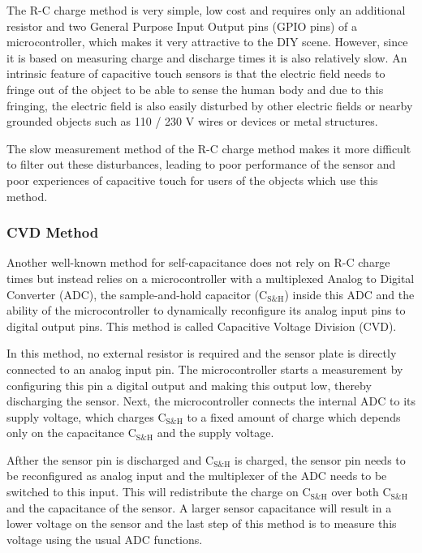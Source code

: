\documentclass{sigchi}
\begin{document}
The R-C charge method is very simple, low cost and requires only an additional
resistor and two General Purpose Input Output pins (GPIO pins) of a
microcontroller, which makes it very attractive to the DIY scene. However, since
it is based on measuring charge and discharge times it is also relatively slow.
An intrinsic feature of capacitive touch sensors is that the electric field
needs to fringe out of the object to be able to sense the human body and due to
this fringing, the electric field is also easily disturbed by other electric
fields or nearby grounded objects such as 110 / 230 V wires or devices or metal
structures.

The slow measurement method of the R-C charge method makes it more difficult to
filter out these disturbances, leading to poor performance of the sensor and
poor experiences of capacitive touch for users of the objects which use this
method.

\subsubsection{CVD Method}
Another well-known method for self-capacitance does not rely on R-C charge times
but instead relies on a microcontroller with a multiplexed Analog to Digital
Converter (ADC), the sample-and-hold capacitor ($\textrm{C}_{\textrm{S\&H}}$)
inside this ADC and the ability of the microcontroller to dynamically
reconfigure its analog input pins to digital output pins. This method is called
Capacitive Voltage Division (CVD).

In this method, no external resistor is required and the sensor plate is
directly connected to an analog input pin. The microcontroller starts a
measurement by configuring this pin a digital output and making this output low,
thereby discharging the sensor. Next, the microcontroller connects the internal
ADC to its supply voltage, which charges $\textrm{C}_{\textrm{S\&H}}$ to a fixed
amount of charge which depends only on the capacitance
$\textrm{C}_{\textrm{S\&H}}$ and the supply voltage.

Afther the sensor pin is discharged and $\textrm{C}_{\textrm{S\&H}}$ is
charged, the sensor pin needs to be reconfigured as analog input and the
multiplexer of the ADC needs to be switched to this input. This will
redistribute the charge on $\textrm{C}_{\textrm{S\&H}}$ over both
$\textrm{C}_{\textrm{S\&H}}$ and the capacitance of the sensor. A larger sensor
capacitance will result in a lower voltage on the sensor and the last step of
this method is to measure this voltage using the usual ADC functions.
\end{document}
